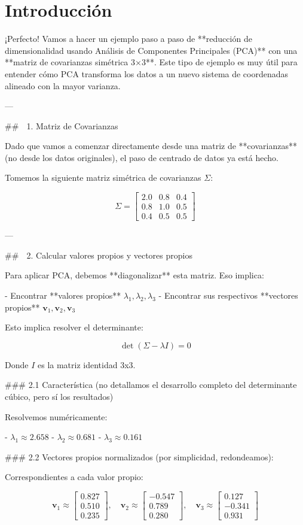 \documentclass[12pt]{article} %
\begin{document}
\section{Introducción}
¡Perfecto! Vamos a hacer un ejemplo paso a paso de **reducción de dimensionalidad usando Análisis de Componentes Principales (PCA)** con una **matriz de covarianzas simétrica 3×3**. Este tipo de ejemplo es muy útil para entender cómo PCA transforma los datos a un nuevo sistema de coordenadas alineado con la mayor varianza.

---

## 🔢 1. Matriz de Covarianzas

Dado que vamos a comenzar directamente desde una matriz de **covarianzas** (no desde los datos originales), el paso de centrado de datos ya está hecho.

Tomemos la siguiente matriz simétrica de covarianzas \( \Sigma \):

\[
\Sigma = 
\begin{bmatrix}
2.0 & 0.8 & 0.4 \\
0.8 & 1.0 & 0.5 \\
0.4 & 0.5 & 0.5
\end{bmatrix}
\]

---

## 🧮 2. Calcular valores propios y vectores propios

Para aplicar PCA, debemos **diagonalizar** esta matriz. Eso implica:

- Encontrar **valores propios** \( \lambda_1, \lambda_2, \lambda_3 \)
- Encontrar sus respectivos **vectores propios** \( \mathbf{v}_1, \mathbf{v}_2, \mathbf{v}_3 \)

Esto implica resolver el determinante:

\[
\det(\Sigma - \lambda I) = 0
\]

Donde \( I \) es la matriz identidad 3x3.

### 2.1 Característica (no detallamos el desarrollo completo del determinante cúbico, pero sí los resultados)

Resolvemos numéricamente:

- \( \lambda_1 \approx 2.658 \)
- \( \lambda_2 \approx 0.681 \)
- \( \lambda_3 \approx 0.161 \)

### 2.2 Vectores propios normalizados (por simplicidad, redondeamos):

Correspondientes a cada valor propio:

\[
\mathbf{v}_1 \approx \begin{bmatrix} 0.827 \\ 0.510 \\ 0.235 \end{bmatrix}, \quad
\mathbf{v}_2 \approx \begin{bmatrix} -0.547 \\ 0.789 \\ 0.280 \end{bmatrix}, \quad
\mathbf{v}_3 \approx \begin{bmatrix} 0.127 \\ -0.341 \\ 0.931 \end{bmatrix}
\]
\end{document}
